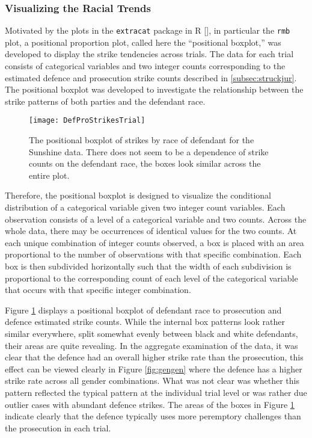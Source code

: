 \subsubsection{Visualizing the Racial Trends} \label{subsec:vistrend}

Motivated by the plots in the \texttt{extracat} package in R [\cite{extracat}], in particular the \texttt{rmb} plot, a
positional proportion plot, called here the ``positional boxplot,'' was developed to display the strike tendencies across
trials. The data for each trial consists of categorical variables and two integer counts corresponding to the estimated defence
and prosecution strike counts described in \ref{subsec:struckjur}. The positional boxplot was developed to investigate the
relationship between the strike patterns of both parties and the defendant race.

\begin{figure}[h!]
  \centering
  \texttt{[image: DefProStrikesTrial]}
  \caption[Prosecution and Defence Strikes by Trial]{\footnotesize The positional boxplot of strikes by race of defendant for the
    Sunshine data. There does not seem to be a dependence of strike counts on the defendant race, the boxes look similar across
    the entire plot.}
  \label{fig:trialprodef}
\end{figure}

Therefore, the positional boxplot is designed to visualize the conditional distribution of a categorical variable given two
integer count variables. Each observation consists of a level of a categorical variable and two counts. Across the whole data,
there may be occurrences of identical values for the two counts. At each unique combination of integer counts observed, a box is
placed with an area proportional to the number of observations with that specific combination. Each box is then subdivided
horizontally such that the width of each subdivision is proportional to the corresponding count of each level of the categorical
variable that occurs with that specific integer combination.

Figure \ref{fig:trialprodef} displays a positional boxplot of defendant race to prosecution and defence estimated strike
counts. While the internal box patterns look rather similar everywhere, split somewhat evenly between black and white defendants,
their areas are quite revealing. In the aggregate examination of the data, it was clear that the defence had an overall higher
strike rate than the prosecution, this effect can be viewed clearly in Figure \ref{fig:gengen} where the defence has a higher
strike rate across all gender combinations. What was not clear was whether this pattern reflected the typical pattern at the
individual trial level or was rather due outlier cases with abundant defence strikes. The areas of the boxes in Figure
\ref{fig:trialprodef} indicate clearly that the defence typically uses more peremptory challenges than the prosecution in each
trial.

